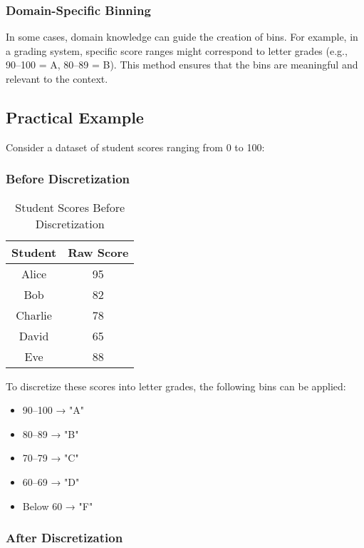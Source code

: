 \documentclass[12pt]{article}
\begin{document}
\subsubsection{Domain-Specific Binning}
In some cases, domain knowledge can guide the creation of bins. For example, in a grading system, specific score ranges might correspond to letter grades (e.g., 90–100 = A, 80–89 = B). This method ensures that the bins are meaningful and relevant to the context.

\subsection{Practical Example}

Consider a dataset of student scores ranging from 0 to 100:

\subsubsection{Before Discretization}

\begin{table}[h!]
    \centering
    \begin{tabular}{|c|c|}
        \hline
        \textbf{Student} & \textbf{Raw Score} \\
        \hline
        Alice & 95 \\
        Bob & 82 \\
        Charlie & 78 \\
        David & 65 \\
        Eve & 88 \\
        \hline
    \end{tabular}
    \caption{Student Scores Before Discretization}
    \label{tab:before_discretization}
\end{table}

To discretize these scores into letter grades, the following bins can be applied:

\begin{itemize}
    \item 90–100 → "A"
    \item 80–89 → "B"
    \item 70–79 → "C"
    \item 60–69 → "D"
    \item Below 60 → "F"
\end{itemize}

\subsubsection{After Discretization}
\end{document}

